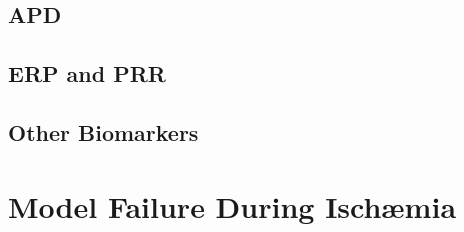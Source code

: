 \documentclass[../thesis-main.tex]{subfiles}
\begin{document}
 \subsection{APD}
 \label{subsec:isch-apd90-response}
 
 \subsection{ERP and PRR}
 \label{subsec:isch-erpprr-response}
 
 \subsection{Other Biomarkers}
 \label{subsec:isch-other-response}
 
 \section{Model Failure During Isch\ae{}mia}
 \label{sec:isch-modelFailure}
\end{document}
